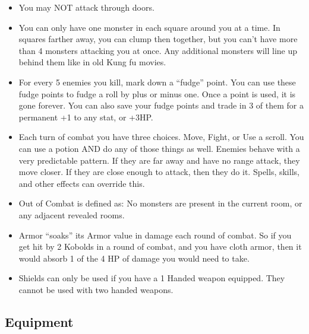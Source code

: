 \documentclass[a6paper,hidelinks]{article}
\begin{document}
\begin{itemize}

\item You may NOT attack through doors.

\item You can only have one monster in each square around you at a time. In squares farther away, you can clump then together, but you can’t have more
than 4 monsters attacking you at once. Any additional monsters will line up behind them like in old Kung fu movies.

\item For every 5 enemies you kill, mark down a ``fudge'' point. You can use these fudge points to fudge a roll by plus or minus one. Once a point is used, it is gone forever. You can also save your fudge points and trade in 3 of them for a permanent +1 to any stat, or +3HP.

\item Each turn of combat you have three choices. Move, Fight, or Use a scroll. You can use a potion AND do any of those things as well. Enemies behave with a very predictable pattern. If they are far away and have no range attack, they move closer. If they are close enough to attack, then they do it. Spells, skills, and other effects can override this.

\item Out of Combat is defined as: No monsters are present in the current room, or any adjacent revealed rooms.

\item Armor “soaks” its Armor value in damage each round of combat. So if you get hit by 2 Kobolds in a round of combat, and you have cloth armor, then it
would absorb 1 of the 4 HP of damage you would need to take.

\item Shields can only be used if you have a 1 Handed weapon equipped. They cannot be used with two handed weapons.

\end{itemize}

\subsection{Equipment}
\end{document}
